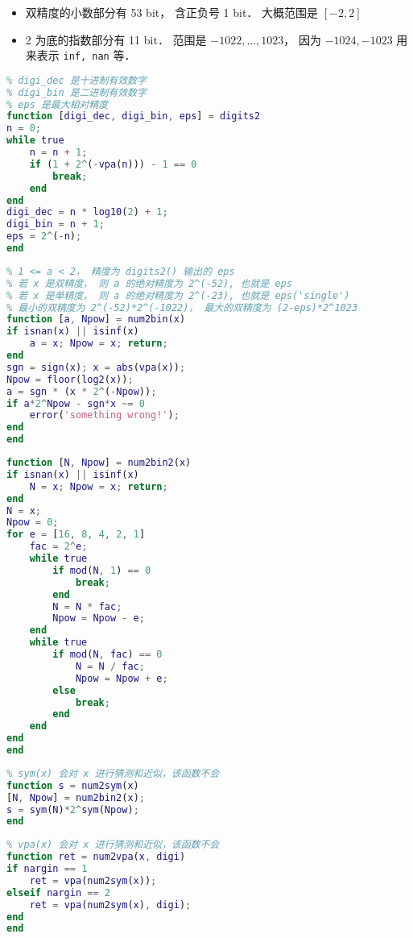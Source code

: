 

\begin{itemize}
\item 双精度的小数部分有 53 bit， 含正负号 1 bit． 大概范围是 $[-2,2]$
\item 2 为底的指数部分有 11 bit． 范围是 $-1022,\dots,1023$， 因为 $-1024, -1023$ 用来表示 \verb|inf, nan| 等．
\end{itemize}

\begin{lstlisting}[language=matlab, caption=digits2.m]
% 求当前 vpa 变精度计算的有效数字
% digi_dec 是十进制有效数字
% digi_bin 是二进制有效数字
% eps 是最大相对精度
function [digi_dec, digi_bin, eps] = digits2
n = 0;
while true
    n = n + 1;
    if (1 + 2^(-vpa(n))) - 1 == 0
        break;
    end
end
digi_dec = n * log10(2) + 1;
digi_bin = n + 1;
eps = 2^(-n);
end
\end{lstlisting}

\begin{lstlisting}[language=matlab, caption=num2bin.m]
% x = a*2^Npw (exactly)
% 1 <= a < 2， 精度为 digits2() 输出的 eps
% 若 x 是双精度， 则 a 的绝对精度为 2^(-52), 也就是 eps
% 若 x 是单精度， 则 a 的绝对精度为 2^(-23), 也就是 eps('single')
% 最小的双精度为 2^(-52)*2^(-1022)， 最大的双精度为 (2-eps)*2^1023
function [a, Npow] = num2bin(x)
if isnan(x) || isinf(x)
    a = x; Npow = x; return;
end
sgn = sign(x); x = abs(vpa(x));
Npow = floor(log2(x));
a = sgn * (x * 2^(-Npow));
if a*2^Npow - sgn*x ~= 0
    error('something wrong!');
end
end
\end{lstlisting}

\begin{lstlisting}[language=matlab, caption=num2bin2.m]
% 精确解出 x = N*2^Npow， 其中 N 是奇数和整数, Npow 是整数
function [N, Npow] = num2bin2(x)
if isnan(x) || isinf(x)
    N = x; Npow = x; return;
end
N = x;
Npow = 0;
for e = [16, 8, 4, 2, 1]
    fac = 2^e;
    while true
        if mod(N, 1) == 0
            break;
        end
        N = N * fac;
        Npow = Npow - e;
    end
    while true
        if mod(N, fac) == 0
            N = N / fac;
            Npow = Npow + e;
        else
            break;
        end
    end
end
end
\end{lstlisting}

\begin{lstlisting}[language=matlab, caption=num2sym.m]
% 双精度转换为符号表达式
% sym(x) 会对 x 进行猜测和近似，该函数不会
function s = num2sym(x)
[N, Npow] = num2bin2(x);
s = sym(N)*2^sym(Npow);
end
\end{lstlisting}

\begin{lstlisting}[language=matlab, caption=num2vpa.m]
% 双精度转换为变精度浮点数
% vpa(x) 会对 x 进行猜测和近似，该函数不会
function ret = num2vpa(x, digi)
if nargin == 1
    ret = vpa(num2sym(x));
elseif nargin == 2
    ret = vpa(num2sym(x), digi);
end
end
\end{lstlisting}
